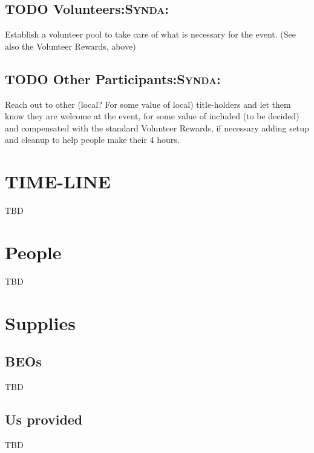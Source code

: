 \documentclass[captions=tablesignature]{scrartcl}
\begin{document}
\subsection{{\bfseries\sffamily TODO} Volunteers\hfill{}\textsc{:Synda:}}
\label{sec-2-16}
Establish a volunteer pool to take care of what is necessary for
the event.  (See also the Volunteer Rewards, above)

\subsection{{\bfseries\sffamily TODO} Other Participants\hfill{}\textsc{:Synda:}}
\label{sec-2-17}
Reach out to other (local?  For some value of local) title-holders
and let them know they are welcome at the event, for some value of
included (to be decided) and compensated with the standard
Volunteer Rewards, if necessary adding setup and cleanup to help
people make their 4 hours.

\section{TIME-LINE}
\label{sec-3}
TBD

\section{People}
\label{sec-4}
TBD

\section{Supplies}
\label{sec-5}
\subsection{BEOs}
\label{sec-5-1}
TBD

\subsection{Us provided}
\label{sec-5-2}
TBD
\end{document}
